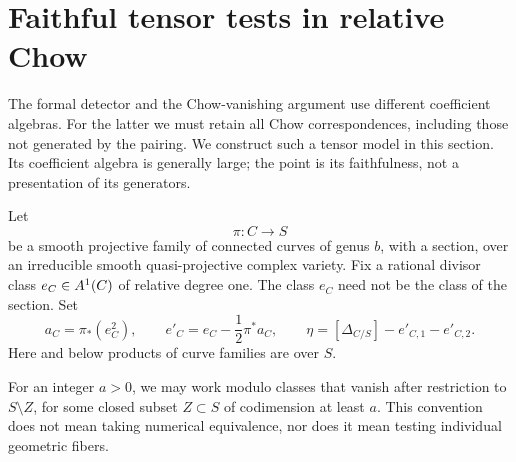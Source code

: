 \section{Faithful tensor tests in relative Chow}
\label{sec:tensors}

The formal detector and the Chow-vanishing argument use different
coefficient algebras.  For the latter we must retain all Chow
correspondences, including those not generated by the pairing.  We
construct such a tensor model in this section.  Its coefficient algebra
is generally large; the point is its faithfulness, not a presentation of
its generators.

Let
\[
 \pi\colon C\longrightarrow S
\]
be a smooth projective family of connected curves of genus \(b\), with a
section, over an irreducible smooth quasi-projective complex variety.
Fix a rational divisor class \(e_C\in A^1(C)\) of relative degree one.
The class \(e_C\) need not be the class of the section.  Set
\begin{equation}
 \label{eq:curve-projector}
 a_C=\pi_*(e_C^2),\qquad
 e'_C=e_C-\frac12\pi^*a_C,\qquad
 \eta=[\Delta_{C/S}]-e'_{C,1}-e'_{C,2}.
\end{equation}
Here and below products of curve families are over \(S\).

For an integer \(a>0\), we may work modulo classes that vanish after
restriction to \(S\setminus Z\), for some closed subset \(Z\subset S\)
of codimension at least \(a\).  This convention does not mean taking
numerical equivalence, nor does it mean testing individual geometric
fibers.

